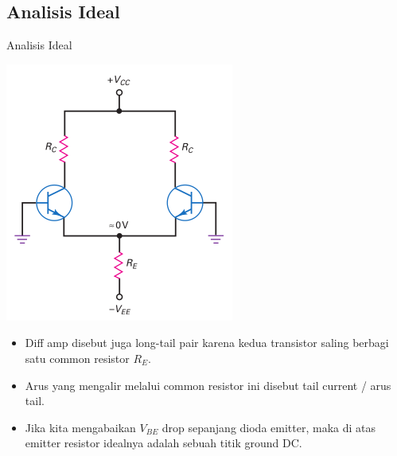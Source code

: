\documentclass[aspectratio=169]{beamer}
\begin{document}
\subsection{Analisis Ideal}
\begin{frame}{Analisis Ideal}
	\begin{multicols}{2}
		\begin{center}
			\includegraphics[width=0.7\textheight]{gambar/01.ideal_dc_analysis}
		\end{center}
		\columnbreak
		\begin{itemize}
			\item Diff amp disebut juga long-tail pair karena kedua transistor saling berbagi satu common resistor $ R_E $.
			\item Arus yang mengalir melalui common resistor ini disebut tail current / arus tail.
			\item Jika kita mengabaikan $ V_{BE} $ drop sepanjang dioda emitter, maka di atas emitter resistor idealnya adalah sebuah titik ground DC.
		\end{itemize}
		\vfill\null
	\end{multicols}
\end{frame}
\end{document}

